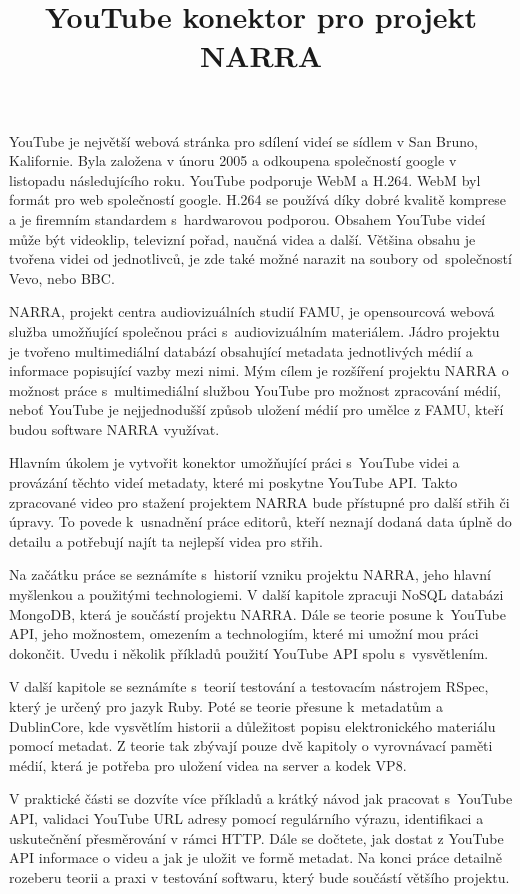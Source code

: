 \documentclass[thesis=B,czech]{FITthesis}[2012/06/26]
\title{YouTube konektor pro projekt NARRA}
\begin{document}

\begin{introduction}
\par YouTube\cite{yout} je největší webová stránka pro sdílení videí se sídlem v San Bruno, Kalifornie. Byla založena v únoru 2005 a odkoupena společností google v listopadu následujícího roku. YouTube podporuje WebM a H.264. WebM\cite{webm} byl formát pro web společností google. H.264 se používá díky dobré kvalitě komprese a je firemním standardem s~hardwarovou podporou. Obsahem YouTube videí může být videoklip, televizní pořad, naučná videa a další. Většina obsahu je tvořena videi od jednotlivců, je zde také možné narazit na soubory od~společností Vevo, nebo BBC.
\par NARRA\cite{narra}, projekt centra audiovizuálních studií FAMU, je opensourcová webová služba umožňující společnou práci s~audiovizuálním materiálem. Jádro projektu je tvořeno multimediální databází obsahující metadata jednotlivých médií a informace popisující vazby mezi nimi. Mým cílem je rozšíření projektu NARRA o možnost práce s~multimediální službou YouTube pro možnost zpracování médií, neboť YouTube je nejjednodušší způsob uložení médií pro umělce z FAMU, kteří budou software NARRA využívat.
\par Hlavním úkolem je vytvořit konektor umožňující práci s~YouTube videi a provázání těchto videí metadaty, které mi poskytne YouTube API. Takto zpracované video pro stažení projektem NARRA bude přístupné pro další střih či úpravy. To povede k~usnadnění práce editorů, kteří neznají dodaná data úplně do detailu a potřebují najít ta nejlepší videa pro střih. 
\par Na začátku práce se seznámíte s~historií vzniku projektu NARRA, jeho hlavní myšlenkou a použitými technologiemi. V další kapitole zpracuji NoSQL databázi MongoDB, která je součástí projektu NARRA. Dále se teorie posune k~YouTube API, jeho možnostem, omezením a technologiím, které mi umožní mou práci dokončit. Uvedu i několik příkladů použití YouTube API spolu s~vysvětlením.
\par V další kapitole se seznámíte s~teorií testování a testovacím nástrojem RSpec, který je určený pro jazyk Ruby. Poté se teorie přesune k~metadatům a DublinCore, kde vysvětlím historii a důležitost popisu elektronického materiálu pomocí metadat. Z teorie tak zbývají pouze dvě kapitoly o vyrovnávací paměti médií, která je potřeba pro uložení videa na server a kodek VP8.
\par V praktické části se dozvíte více příkladů a krátký návod jak pracovat s~YouTube API, validaci YouTube URL adresy pomocí regulárního výrazu, identifikaci a uskutečnění přesměrování v rámci HTTP. Dále se dočtete, jak dostat z YouTube API informace o videu a jak je uložit ve formě metadat. Na konci práce detailně rozeberu teorii a praxi v testování softwaru, který bude součástí většího projektu.
\end{introduction}
\end{document}
